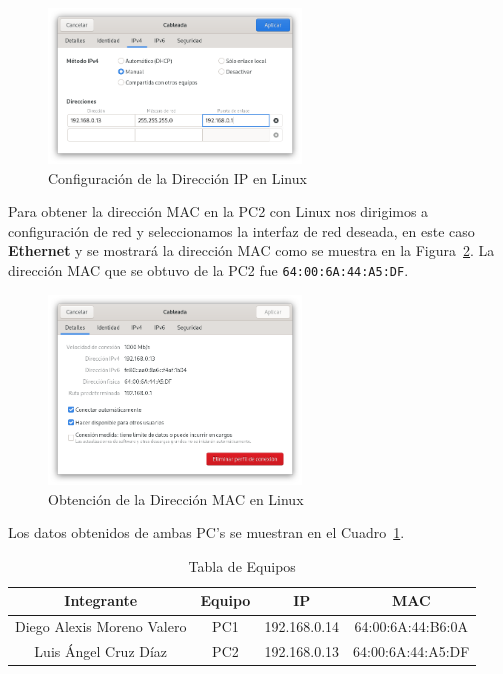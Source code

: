         \begin{figure}[H]
            \centering
            \includegraphics[width=0.6\textwidth]{img/cambiar_IP_Linux.png}
            \caption{Configuración de la Dirección IP en Linux}
            \label{fig:ip_linux}
        \end{figure}

        Para obtener la dirección MAC en la PC2 con Linux nos dirigimos a configuración de red y seleccionamos la interfaz de red deseada, en este caso \textbf{Ethernet} y se mostrará la dirección MAC como se muestra en la Figura~\ref{fig:mac_linux}. La dirección MAC que se obtuvo de la PC2 fue \texttt{64:00:6A:44:A5:DF}.
        \begin{figure}[H]
            \centering
            \includegraphics[width=0.6\textwidth]{img/direccion_MAC_linux.png}
            \caption{Obtención de la Dirección MAC en Linux}
            \label{fig:mac_linux}
        \end{figure}

        Los datos obtenidos de ambas PC's se muestran en el Cuadro~\ref{tab:tabla_equipos}.

        \begin{table}[H]
            \centering
            \begin{tabular}{c|c|c|c}
                \textbf{Integrante} & \textbf{Equipo} & \textbf{IP} & \textbf{MAC} \\
                \hline
                Diego Alexis Moreno Valero & PC1 & 192.168.0.14 & 64:00:6A:44:B6:0A \\
                Luis Ángel Cruz Díaz & PC2 & 192.168.0.13 & 64:00:6A:44:A5:DF \\
            \end{tabular}
            \caption{Tabla de Equipos}
            \label{tab:tabla_equipos}
        \end{table}
